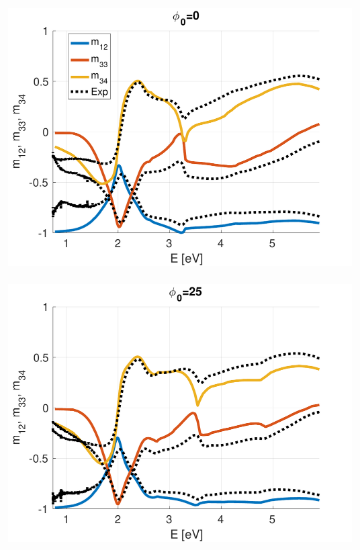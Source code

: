 \begin{figure}[h!]
   \begin{subfigure}{0.32\linewidth}
        \centering
        \includegraphics[width=\linewidth, trim= 0cm 0cm 0cm 0cm, clip]{figures/ch4/S5A/S5A_NCS_phi0.pdf}
   \end{subfigure}
   \begin{subfigure}{0.32\linewidth}
        \centering
        \includegraphics[width=\linewidth, trim= 0cm 0cm 0cm 0cm, clip]{figures/ch4/S5A/S5A_NCS_phi25.pdf}
   \end{subfigure}
   \begin{subfigure}{0.32\linewidth}
        \centering

\end{subfigure}
\end{figure}
